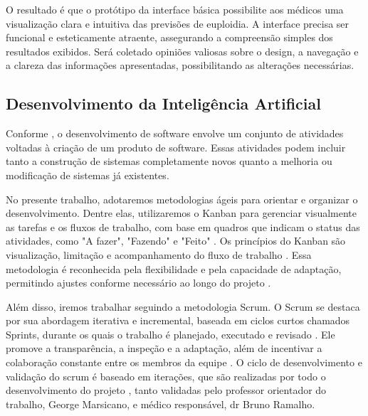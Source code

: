 O resultado é que o protótipo da interface básica possibilite aos médicos uma visualização clara e intuitiva das previsões de euploidia. A interface precisa ser funcional e esteticamente atraente, assegurando a compreensão simples dos resultados exibidos. Será coletado opiniões valiosas sobre o design, a navegação e a clareza das informações apresentadas, possibilitando as alterações necessárias.

\subsection{Desenvolvimento da Inteligência Artificial}

Conforme , o desenvolvimento de software envolve um conjunto de atividades voltadas à criação de um produto de software. Essas atividades podem incluir tanto a construção de sistemas completamente novos quanto a melhoria ou modificação de sistemas já existentes.

No presente trabalho, adotaremos metodologias ágeis para orientar e organizar o desenvolvimento. Dentre elas, utilizaremos o Kanban para gerenciar visualmente as tarefas e os fluxos de trabalho, com base em quadros que indicam o status das atividades, como "A fazer", "Fazendo" e "Feito" \cite{kniberg2010}. Os princípios do Kanban são visualização, limitação e acompanhamento do fluxo de trabalho \cite{kniberg2010}. Essa metodologia é reconhecida pela flexibilidade e pela capacidade de adaptação, permitindo ajustes conforme necessário ao longo do projeto \cite{kniberg2010}.

Além disso, iremos trabalhar seguindo a metodologia Scrum. O Scrum se destaca por sua abordagem iterativa e incremental, baseada em ciclos curtos chamados Sprints, durante os quais o trabalho é planejado, executado e revisado \cite{schwaber2010}. Ele promove a transparência, a inspeção e a adaptação, além de incentivar a colaboração constante entre os membros da equipe \cite{schwaber2010}. O ciclo de desenvolvimento e validação do scrum é baseado em iterações, que são realizadas por todo o desenvolvimento do projeto \cite{schwaber2010}, tanto validadas pelo professor orientador do trabalho, George Marsicano, e médico responsável, dr Bruno Ramalho. 